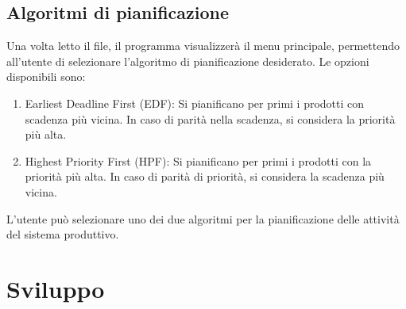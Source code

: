 \documentclass[a4paper]{report}
\begin{document}
\subsection{Algoritmi di pianificazione}
Una volta letto il file, il programma visualizzerà il menu principale, permettendo all'utente di selezionare l'algoritmo di pianificazione desiderato. Le opzioni disponibili sono:

\begin{enumerate}
  \item Earliest Deadline First (EDF): Si pianificano per primi i prodotti con scadenza più vicina. In caso di parità nella scadenza, si considera la priorità più alta.
  \item Highest Priority First (HPF): Si pianificano per primi i prodotti con la priorità più alta. In caso di parità di priorità, si considera la scadenza più vicina.
\end{enumerate}

L'utente può selezionare uno dei due algoritmi per la pianificazione delle attività del sistema produttivo.

\section{Sviluppo}
\end{document}
